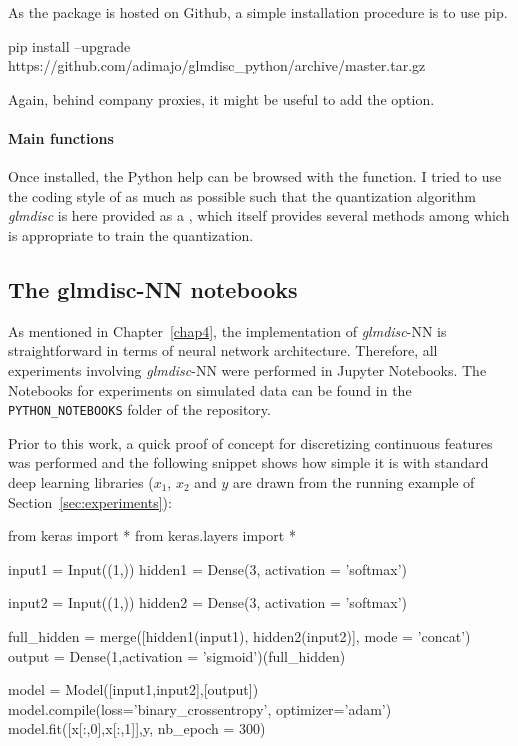 As the package is hosted on Github, a simple installation procedure is to use pip.

\begin{bashlisting}
pip install --upgrade https://github.com/adimajo/glmdisc_python/archive/master.tar.gz
\end{bashlisting}

Again, behind company proxies, it might be useful to add the  option.

\paragraph{Main functions}

Once installed, the Python help can be browsed with the  function. I tried to use the coding style of  as much as possible such that the quantization algorithm \textit{glmdisc} is here provided as a , which itself provides several methods among which  is appropriate to train the quantization.

\subsection{The glmdisc-NN notebooks} \label{app2:nn}

As mentioned in Chapter~\ref{chap4}, the implementation of \textit{glmdisc}-NN is straightforward in terms of neural network architecture. Therefore, all experiments involving \textit{glmdisc}-NN were performed in Jupyter Notebooks. The Notebooks for experiments on simulated data can be found in the \verb|PYTHON_NOTEBOOKS| folder of the repository.

Prior to this work, a quick proof of concept for discretizing continuous features was performed and the following snippet shows how simple it is with standard deep learning libraries ($x_1$, $x_2$ and $y$ are drawn from the running example of Section~\ref{sec:experiments}):

\begin{pylisting}
from keras import *
from keras.layers import *

input1 = Input((1,))
hidden1 = Dense(3, activation = 'softmax')

input2 = Input((1,))
hidden2 = Dense(3, activation = 'softmax')

full_hidden = merge([hidden1(input1), hidden2(input2)], mode = 'concat')
output = Dense(1,activation = 'sigmoid')(full_hidden)

model = Model([input1,input2],[output])
model.compile(loss='binary_crossentropy', optimizer='adam')
model.fit([x[:,0],x[:,1]],y, nb_epoch = 300)
\end{pylisting}


